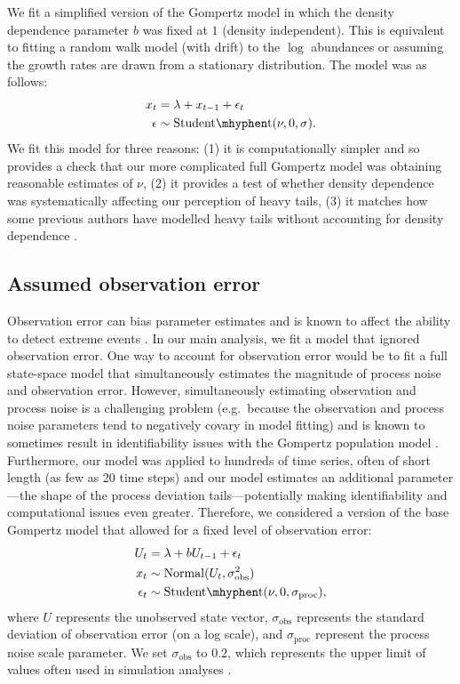 We fit a simplified version of the Gompertz model in which the density
dependence parameter $b$ was fixed at $1$ (density independent). This is
equivalent to fitting a random walk model (with drift) to the $\log$
abundances or assuming the growth rates are drawn from a stationary
distribution. The model was as follows:
\begin{align*}
x_t &= \lambda + x_{t-1} + \epsilon_t\\
\epsilon &\sim \mathrm{Student\mhyphen t}(\nu, 0, \sigma).
\end{align*}
We fit this model for three reasons: (1) it is computationally simpler and so
provides a check that our more complicated full Gompertz model was obtaining
reasonable estimates of $\nu$, (2) it provides a test of whether density
dependence was systematically affecting our perception of heavy tails, (3) it
matches how some previous authors have modelled heavy tails without accounting
for density dependence \citep{segura2013}.

\subsection{Assumed observation error}

Observation error can bias parameter estimates \citep[e.g.][]{knape2012} and
is known to affect the ability to detect extreme events \citep{ward2007}. In
our main analysis, we fit a model that ignored observation error. One way to
account for observation error would be to fit a full state-space model that
simultaneously estimates the magnitude of process noise and observation error.
However, simultaneously estimating observation and process noise is a
challenging problem (e.g.\ because the observation and process noise
parameters tend to negatively covary in model fitting) and is known to
sometimes result in identifiability issues with the Gompertz population model
\citep{knape2008}. Furthermore, our model was applied to hundreds of time
series, often of short length (as few as 20 time steps) and our model
estimates an additional parameter---the shape of the process deviation
tails---potentially making identifiability and computational issues even
greater. Therefore, we considered a version of the base Gompertz model that
allowed for a fixed level of observation error:
\begin{align*}
U_t &= \lambda + b U_{t-1} + \epsilon_t\\
x_t &\sim \mathrm{Normal}(U_t, \sigma_\mathrm{obs}^2)\\
\epsilon_t &\sim \mathrm{Student\mhyphen t}(\nu, 0, \sigma_\mathrm{proc}),
\end{align*}
where $U$ represents the unobserved state vector, $\sigma_\mathrm{obs}$
represents the standard deviation of observation error (on a log scale), and
$\sigma_\mathrm{proc}$ represent the process noise scale parameter. We set
$\sigma_\mathrm{obs}$ to $0.2$, which represents the upper limit of values
often used in simulation analyses \citep[e.g.][]{valpine2002, thorson2014b}.

